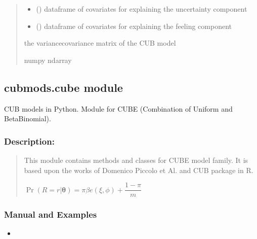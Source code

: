 \documentclass[letterpaper,10pt,english]{sphinxmanual}
\begin{document}
\begin{fulllineitems}
\begin{quote}
\begin{description}
\begin{itemize}
\item {} 
\sphinxAtStartPar
{} () \textendash{} dataframe of covariates for explaining the uncertainty component

\item {} 
\sphinxAtStartPar
{} () \textendash{} dataframe of covariates for explaining the feeling component

\end{itemize}

\sphinxAtStartPar
the variance\sphinxhyphen{}covariance matrix of the CUB model

\sphinxAtStartPar
numpy ndarray

\end{description}\end{quote}

\end{fulllineitems}



\subsection{cubmods.cube module}
\label{\detokenize{cubmods:module-cubmods.cube}}\label{\detokenize{cubmods:cubmods-cube-module}}\label{\detokenize{cubmods:cube000-module}}
\sphinxAtStartPar
CUB models in Python.
Module for CUBE (Combination of Uniform
and Beta\sphinxhyphen{}Binomial).


\subsubsection{Description:}
\label{\detokenize{cubmods:id204}}\begin{quote}

\sphinxAtStartPar
This module contains methods and classes
for CUBE model family.
It is based upon the works of Domenico
Piccolo et Al. and CUB package in R.

\sphinxAtStartPar
\(\Pr(R=r|\pmb{\theta}) = \pi \beta e(\xi,\phi)+\dfrac{1-\pi}{m}\)
\end{quote}


\subsubsection{Manual and Examples}
\label{\detokenize{cubmods:id205}}\begin{itemize}
\item {} 
\sphinxAtStartPar
{}

\end{itemize}
\end{document}
